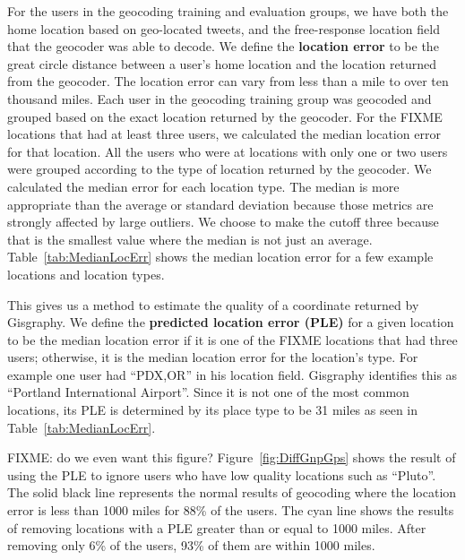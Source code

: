 For the users in the geocoding training and evaluation groups, we have both the
home location based on geo-located tweets, and the free-response location field
that the geocoder was able to decode.
We define the \textbf{location error} to be the great circle distance between a
user's home location and the location returned from the geocoder.
The location error can vary from less than a mile to over ten thousand miles.
Each user in the geocoding training group was geocoded and grouped based on the
exact location returned by the geocoder.
For the FIXME locations that had at least three users, we calculated the median
location error for that location.
All the users who were at locations with only one or two users were grouped
according to the type of location returned by the geocoder.
We calculated the median error for each location type.
The median is more appropriate than the average or standard deviation because
those metrics are strongly affected by large outliers.
We choose to make the cutoff three because that is the smallest value where the
median is not just an average.
Table~\ref{tab:MedianLocErr} shows the median location error for a few example
locations and location types.

This gives us a method to estimate the quality of a coordinate returned by
Gisgraphy.
We define the \textbf{predicted location error (PLE)} for a given location to
be the median location error if it is one of the FIXME locations that had three
users; otherwise, it is the median location error for the location's type.
For example one user had ``PDX,OR'' in his location field. Gisgraphy identifies
this as ``Portland International Airport''. Since it is not one of the most
common locations, its PLE is determined by its place type to be 31 miles as
seen in Table~\ref{tab:MedianLocErr}.

FIXME: do we even want this figure?
Figure~\ref{fig:DiffGnpGps} shows the result of using the PLE to ignore users
who have low quality locations such as ``Pluto''.
The solid black line represents the normal results of geocoding where the
location error is less than 1000 miles for 88\% of the users.
The cyan line shows the results of removing locations with a PLE greater than
or equal to 1000 miles.
After removing only 6\% of the users, 93\% of them are within 1000 miles.
